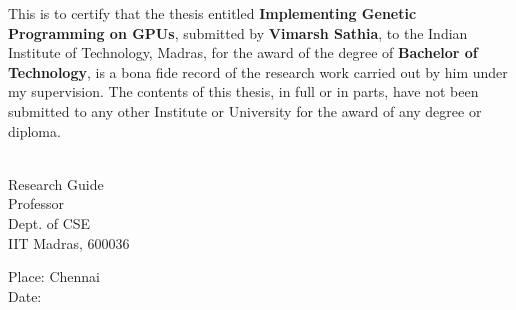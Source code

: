 \certificate

\vspace*{0.5in}

\noindent This is to certify that the thesis entitled {\bf Implementing Genetic Programming on GPUs}, 
submitted by {\bf Vimarsh Sathia}, to the Indian Institute of Technology, 
Madras, for the award of the degree of {\bf Bachelor of Technology}, 
is a bona fide record of the research work carried out by him under my
supervision. The contents of this thesis, in full or in parts, have not been
submitted to any other Institute or University for the award of any degree or
diploma.

\vspace*{1.4in}
\hspace*{-0.25in}
\begin{singlespacing}
	\hspace*{-0.25in}
	\parbox{2.5in}{
		 \\
		\noindent Research Guide \\ 
		\noindent Professor \\
		\noindent Dept. of CSE\\
		\noindent IIT Madras, 600036 \\
	} 
	\hspace*{1.0in} 
\end{singlespacing}
\vspace*{0.25in}
\noindent Place: Chennai\\
Date: %